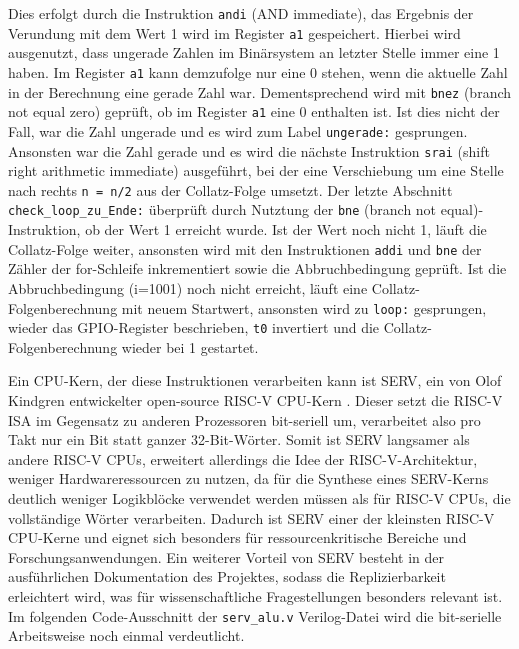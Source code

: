     Dies erfolgt durch die Instruktion \verb|andi| (AND immediate), das Ergebnis der Verundung mit dem Wert 1 wird im Register \verb|a1| gespeichert.
    Hierbei wird ausgenutzt, dass ungerade Zahlen im Binärsystem an letzter Stelle immer eine 1 haben.
    Im Register \verb|a1| kann demzufolge nur eine 0 stehen, wenn die aktuelle Zahl in der Berechnung eine gerade Zahl war.
    Dementsprechend wird mit \verb|bnez| (branch not equal zero) geprüft, ob im Register \verb|a1| eine 0 enthalten ist.
    Ist dies nicht der Fall, war die Zahl ungerade und es wird zum Label \verb|ungerade:| gesprungen.
    Ansonsten war die Zahl gerade und es wird die nächste Instruktion \verb|srai| (shift right arithmetic immediate) ausgeführt, bei der eine Verschiebung um eine Stelle nach rechts \verb|n = n/2| aus der Collatz-Folge umsetzt.
    Der letzte Abschnitt \verb|check_loop_zu_Ende:| überprüft durch Nutztung der \verb|bne| (branch not equal)-Instruktion, ob der Wert 1 erreicht wurde.
    Ist der Wert noch nicht 1, läuft die Collatz-Folge weiter, ansonsten wird mit den Instruktionen \verb|addi| und \verb|bne| der Zähler der for-Schleife inkrementiert sowie die Abbruchbedingung geprüft.
    Ist die Abbruchbedingung (i=1001) noch nicht erreicht, läuft eine Collatz-Folgenberechnung mit neuem Startwert, ansonsten wird zu \verb|loop:| gesprungen, wieder das GPIO-Register beschrieben, \verb|t0| invertiert und die Collatz-Folgenberechnung wieder bei 1 gestartet.

    Ein CPU-Kern, der diese Instruktionen verarbeiten kann ist SERV, ein von Olof Kindgren entwickelter open-source RISC-V CPU-Kern \parencite{kindgren_serv}.
    Dieser setzt die RISC-V ISA im Gegensatz zu anderen Prozessoren bit-seriell um, verarbeitet also pro Takt nur ein Bit statt ganzer 32-Bit-Wörter.
    Somit ist SERV langsamer als andere RISC-V CPUs, erweitert allerdings die Idee der RISC-V-Architektur, weniger Hardwareressourcen zu nutzen, da für die Synthese eines SERV-Kerns deutlich weniger Logikblöcke verwendet werden müssen als für RISC-V CPUs, die vollständige Wörter verarbeiten.
    Dadurch ist SERV einer der kleinsten RISC-V CPU-Kerne und eignet sich besonders für ressourcenkritische Bereiche und Forschungsanwendungen.
    Ein weiterer Vorteil von SERV besteht in der ausführlichen Dokumentation des Projektes, sodass die Replizierbarkeit erleichtert wird, was für wissenschaftliche Fragestellungen besonders relevant ist.
    Im folgenden Code-Ausschnitt der \verb|serv_alu.v| Verilog-Datei wird die bit-serielle Arbeitsweise noch einmal verdeutlicht.

